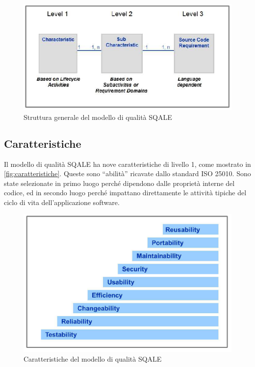 \begin{figure}[htbp]
	\centering
	\includegraphics[scale=0.7, trim = 0cm 0cm 0cm 0cm, clip=true]{figSonarCloud/SQALE.PNG}
	\caption{Struttura generale del modello di qualità SQALE}
	\label{fig:sqale}
\end{figure}

\subsection{Caratteristiche}
Il modello di qualità SQALE ha nove caratteristiche di livello 1, come mostrato in \autoref{fig:caratteristiche}. Queste sono “abilità” ricavate dallo standard ISO 25010. Sono state selezionate in primo luogo perché dipendono dalle proprietà interne del codice, ed in secondo luogo perché impattano direttamente le attività tipiche del ciclo di vita dell’applicazione software.

\begin{figure}[htbp]
	\centering
	\includegraphics[scale=0.7, trim = 0cm 0cm 0cm 0cm, clip=true]{figSonarCloud/caratteristiche.PNG}
	\caption{Caratteristiche del modello di qualità SQALE}
	\label{fig:caratteristiche}
\end{figure}

